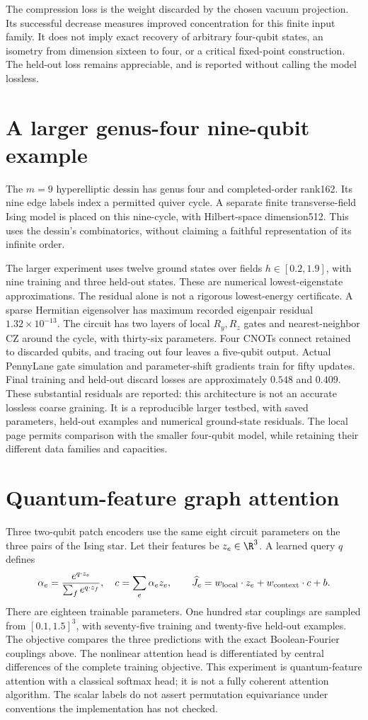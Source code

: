 \documentclass[11pt,oneside,openany]{book}
\theoremstyle{definition}\newtheorem{definition}[theorem]{Definition}
\theoremstyle{remark}\newtheorem{remark}[theorem]{Remark}
\begin{document}
The compression loss is the weight discarded by the chosen vacuum projection. Its successful decrease measures improved concentration for this finite input family. It does not imply exact recovery of arbitrary four-qubit states, an isometry from dimension sixteen to four, or a critical fixed-point construction. The held-out loss remains appreciable, and is reported without calling the model lossless.

\section{A larger genus-four nine-qubit example}
The $m=9$ hyperelliptic dessin has genus four and completed-order rank162. Its nine edge labels index a permitted quiver cycle. A separate finite transverse-field Ising model is placed on this nine-cycle, with Hilbert-space dimension512. This uses the dessin's combinatorics, without claiming a faithful representation of its infinite order.

The larger experiment uses twelve ground states over fields $h\in[0.2,1.9]$, with nine training and three held-out states. These are numerical lowest-eigenstate approximations. The residual alone is not a rigorous lowest-energy certificate. A sparse Hermitian eigensolver has maximum recorded eigenpair residual $1.32\times10^{-13}$. The circuit has two layers of local $R_y,R_z$ gates and nearest-neighbor CZ around the cycle, with thirty-six parameters. Four CNOTs connect retained to discarded qubits, and tracing out four leaves a five-qubit output. Actual PennyLane gate simulation and parameter-shift gradients train for fifty updates. Final training and held-out discard losses are approximately $0.548$ and $0.409$. These substantial residuals are reported: this architecture is not an accurate lossless coarse graining. It is a reproducible larger testbed, with saved parameters, held-out examples and numerical ground-state residuals. The local page permits comparison with the smaller four-qubit model, while retaining their different data families and capacities.

\section{Quantum-feature graph attention}
Three two-qubit patch encoders use the same eight circuit parameters on the three pairs of the Ising star. Let their features be $z_e\in\R^3$. A learned query $q$ defines
\[
 \alpha_e=\frac{e^{q\cdot z_e}}{\sum_f e^{q\cdot z_f}},\quad
 c=\sum_e\alpha_e z_e,\qquad
 \widehat J_e=w_{\rm local}\cdot z_e+w_{\rm context}\cdot c+b.
\]
There are eighteen trainable parameters. One hundred star couplings are sampled from $[0.1,1.5]^3$, with seventy-five training and twenty-five held-out examples. The objective compares the three predictions with the exact Boolean-Fourier couplings above. The nonlinear attention head is differentiated by central differences of the complete training objective. This experiment is quantum-feature attention with a classical softmax head; it is not a fully coherent attention algorithm. The scalar labels do not assert permutation equivariance under conventions the implementation has not checked.
\end{document}
